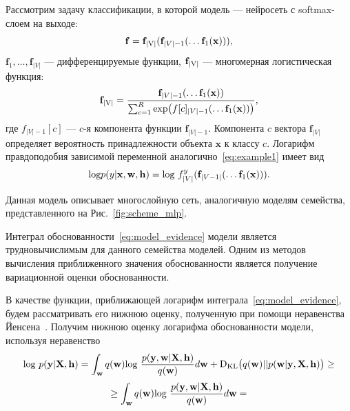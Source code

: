 \begin{example}
Рассмотрим задачу классификации, в которой модель --- нейросеть с softmax-слоем на выходе:
\begin{equation}
\label{eq:softmax_example}
\mathbf{f} = \mathbf{f}_\textnormal{|V|}(\mathbf{f}_{|V|-1}(\dots \mathbf{f}_1(\mathbf{x}))),
\end{equation}
$\mathbf{f}_1, \dots, \mathbf{f}_{|V|}$ --- дифференцируемые функции, $\mathbf{f}_\textnormal{|V|}$ --- многомерная логистическая функция:
\begin{equation}
\label{eq:proba_softmax}
	\mathbf{f}_\textnormal{|V|} = \frac{\mathbf{f}_{|V|-1}(\dots \mathbf{f}_1(\mathbf{x}))}{\sum_{c=1}^R \textnormal{exp}\bigl( {f}[c]_{|V|-1}(\dots \mathbf{f}_1(\mathbf{x})) \bigr)},
\end{equation}
где ${f}_{|V|-1}[c]$ --- $c$-я компонента функции $\mathbf{f}_{|V|-1}$. Компонента $c$ вектора $\mathbf{f}_{|V|}$ определяет вероятность принадлежности объекта $\mathbf{x}$ к классу $c$. Логарифм правдоподобия зависимой переменной аналогично~\eqref{eq:example1} имеет вид
\[
	\textnormal{log} p({y}|\mathbf{x}, \mathbf{w}, \mathbf{h}) =  \textnormal{log}~{f}^{y}_{|V|} (\mathbf{f}_{|V-1|}(\dots \mathbf{f}_1(\mathbf{x}))).
\]

Данная модель описывает многослойную сеть, аналогичную моделям семейства, представленного на Рис.~\ref{fig:scheme_mlp}.
\end{example}

Интеграл обоснованности~\eqref{eq:model_evidence} модели является трудновычислимым для данного семейства моделей. Одним из методов вычисления приближенного значения обоснованности является получение вариационной оценки обоснованности.  


{В качестве функции, приближающей логарифм интеграла~\eqref{eq:model_evidence}, будем рассматривать его нижнюю оценку, полученную при помощи неравенства Йенсена~\cite{bishop}. Получим нижнюю оценку логарифма обоснованности модели, используя неравенство}
\begin{equation} 
\label{eq:var_elbo}
\textnormal{log}~p(\mathbf{y}|\mathbf{X},\mathbf{h})  = \int_{\mathbf{w}} q(\mathbf{w})\textnormal{log}~\frac{p(\mathbf{y},\mathbf{w}|\mathbf{X},\mathbf{h})}{q(\mathbf{w})}d\mathbf{w} + \textnormal{D}_\textnormal{KL}  \bigl(q(\mathbf{w})||p(\mathbf{w}|\mathbf{y}, \mathbf{X}, \mathbf{h})\bigr) \geq	
\end{equation} 
$$
\geq \int_{\mathbf{w}} q(\mathbf{w})\textnormal{log}~\frac{p(\mathbf{y},\mathbf{w}|\mathbf{X},\mathbf{h})}{q(\mathbf{w})}d\mathbf{w} =
$$

